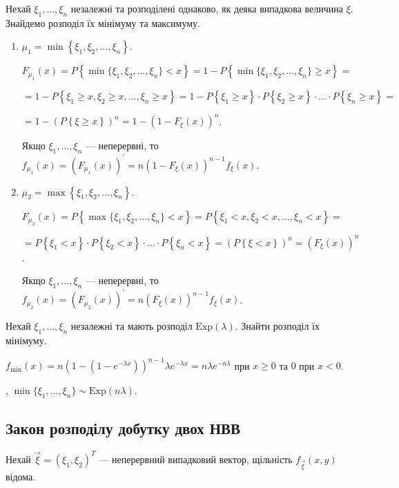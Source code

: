 Нехай $\xi_1, ..., \xi_n$ незалежні та розподілені однаково, як деяка випадкова величина $\xi$.
Знайдемо розподіл їх мінімуму та максимуму.
\begin{enumerate}
    \item $\mu_1 = \min\left\{\xi_1, \xi_2, ..., \xi_n\right\}$.

    $F_{\mu_1} (x) = P \left\{ \min\{\xi_1, \xi_2, ..., \xi_n\} < x \right\} =
    1 - P \left\{ \min\{\xi_1, \xi_2, ..., \xi_n\} \geq x \right\} =$

    $ = 1 - P \left\{ \xi_1 \geq x, \xi_2 \geq x, ..., \xi_n \geq x \right\} = 
    1 - P\left\{ \xi_1 \geq x\right\} \cdot P\left\{ \xi_2 \geq x\right\} \cdot ... \cdot P\left\{ \xi_n \geq x\right\} = $
    
    $ = 1 - (P\left\{ \xi \geq x\right\})^n = 1 - (1- F_\xi (x))^n$.

    Якщо $\xi_1, ..., \xi_n$ --- неперервні, то $f_{\mu_1} (x) = \left( F_{\mu_1} (x)\right)^\prime = n (1- F_\xi (x))^{n-1} f_\xi(x)$.
    \item $\mu_2 = \max\left\{\xi_1, \xi_2, ..., \xi_n\right\}$.

    $F_{\mu_2} (x) = P \left\{ \max\{\xi_1, \xi_2, ..., \xi_n\} < x \right\} =
    P \left\{ \xi_1 < x, \xi_2 < x, ..., \xi_n < x \right\} = $

    $ = P\left\{ \xi_1 < x\right\} \cdot P\left\{ \xi_2 < x\right\} \cdot ... \cdot P\left\{ \xi_n < x\right\} =
    (P\left\{ \xi < x\right\})^n = (F_\xi (x))^n$.

    Якщо $\xi_1, ..., \xi_n$ --- неперервні, то $f_{\mu_2} (x) = \left( F_{\mu_2} (x)\right)^\prime = n (F_\xi (x))^{n-1} f_\xi(x)$.
\end{enumerate}

\begin{example}
    Нехай $\xi_1, ..., \xi_n$ незалежні та мають розподіл $\mathrm{Exp}(\lambda)$. Знайти розподіл їх мінімуму.

    \noindent$f_{\min}(x) = n (1-(1-e^{-\lambda x}))^{n-1} \lambda e^{-\lambda x} = n \lambda e^{-n\lambda}$ при $x \geq 0$ та $0$ при $x < 0$.
    
    , $\min\{\xi_1, ..., \xi_n\} \sim \mathrm{Exp} (n \lambda)$.
\end{example}

\subsection{Закон розподілу добутку двох НВВ}
Нехай $\vec{\xi} = (\xi_1, \xi_2)^T$ --- неперервний випадковий вектор, щільність
$f_{\vec{\xi}}(x, y)$ відома.

